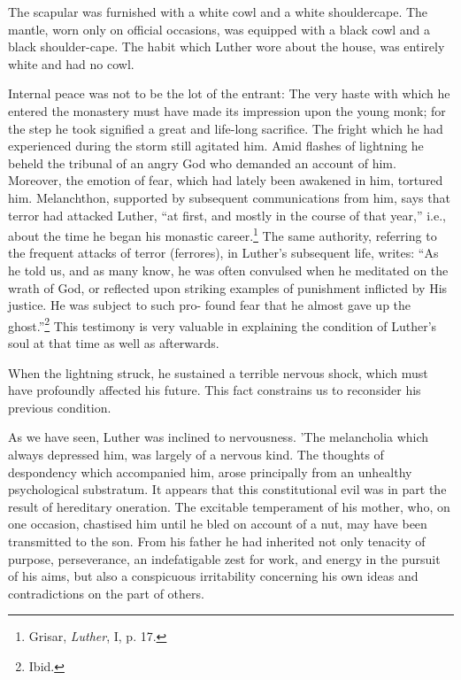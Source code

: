 The scapular was furnished with a white cowl and a white shouldercape. The mantle, worn only on official occasions, was equipped with
a black cowl and a black shoulder-cape. The habit which Luther
wore about the house, was entirely white and had no cowl.

Internal peace was not to be the lot of the entrant: The very haste
with which he entered the monastery must have made its impression
upon the young monk; for the step he took signified a great and
life-long sacrifice. The fright which he had experienced during the
storm still agitated him. Amid flashes of lightning he beheld the
tribunal of an angry God who demanded an account of him. Moreover,
the emotion of fear, which had lately been awakened in him,
tortured him. Melanchthon, supported by subsequent communications
from him, says that terror had attacked Luther, “at first, and
mostly in the course of that year,” i.e., about the time he began his monastic career.\footnote
{Grisar, \textit{Luther}, I, p. 17.}
The same authority, referring to the frequent attacks of terror (ferrores), in Luther’s
subsequent life, writes: “As he told us, and as many know, he was often convulsed when he meditated on the wrath of God, or reflected upon striking examples of punishment inflicted by His justice. He was subject to such pro- found fear that he almost gave up the ghost.”\footnote{Ibid.}
This testimony is very valuable in explaining the condition of Luther’s soul at that time as well as afterwards.

When the lightning struck, he sustained a terrible nervous shock, which must have profoundly affected his future.
This fact constrains us to reconsider his previous condition.

As we have seen, Luther was inclined to nervousness. 'The melancholia
which always depressed him, was largely of a nervous kind. The thoughts
of despondency which accompanied him, arose principally from an unhealthy
psychological substratum. It appears that this constitutional evil was
in part the result of hereditary oneration. The excitable temperament of
his mother, who, on one occasion, chastised him until he bled on account of a nut, may have
been transmitted to the son. From his father he had inherited not
only tenacity of purpose, perseverance, an indefatigable zest for
work, and energy in the pursuit of his aims, but also a conspicuous
irritability concerning his own ideas and contradictions on the part
of others.

